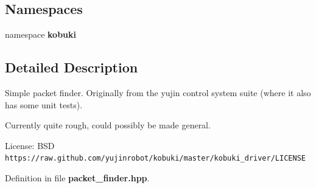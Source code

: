 \subsection*{\-Namespaces}
\begin{DoxyCompactItemize}
\item 
namespace {\bf kobuki}
\end{DoxyCompactItemize}


\subsection{\-Detailed \-Description}
\-Simple packet finder. \-Originally from the yujin control system suite (where it also has some unit tests).

\-Currently quite rough, could possibly be made general.

\-License\-: \-B\-S\-D {\tt https\-://raw.\-github.\-com/yujinrobot/kobuki/master/kobuki\-\_\-driver/\-L\-I\-C\-E\-N\-S\-E} 

\-Definition in file {\bf packet\-\_\-finder.\-hpp}.


